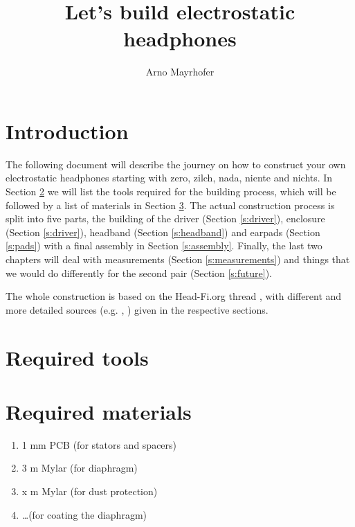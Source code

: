 \documentclass{article}
\begin{document}
\title{Let's build electrostatic headphones}
\author{Arno Mayrhofer}
\maketitle

\tableofcontents

\newpage

\section{Introduction}
\label{s:intro}
The following document will describe the journey on how to construct your own electrostatic headphones starting with zero, zilch, nada, niente and nichts. In Section \ref{s:tools} we will list the tools required for the building process, which will be followed by a list of materials in Section \ref{s:materials}. The actual construction process is split into five parts, the building of the driver (Section \ref{s:driver}), enclosure (Section \ref{s:driver}), headband (Section \ref{s:headband}) and earpads (Section \ref{s:pads}) with a final assembly in Section \ref{s:assembly}. Finally, the last two chapters will deal with measurements (Section \ref{s:measurements}) and things that we would do differently for the second pair (Section \ref{s:future}).

The whole construction is based on the Head-Fi.org thread \cite{head-fi-diy-thread}, with different and more detailed sources (e.g. \cite{electrostatic-hp-design}, \cite{tcengineering-electrostatic-drivers}) given in the respective sections.

\section{Required tools}
\label{s:tools}

\section{Required materials}
\label{s:materials}
\begin{enumerate}
    \item 1 mm PCB (for stators and spacers)
    \item 3 \mu m Mylar (for diaphragm)
    \item x \mu m Mylar (for dust protection) %
    \item \ldots (for coating the diaphragm) %
\end{enumerate}
\end{document}
